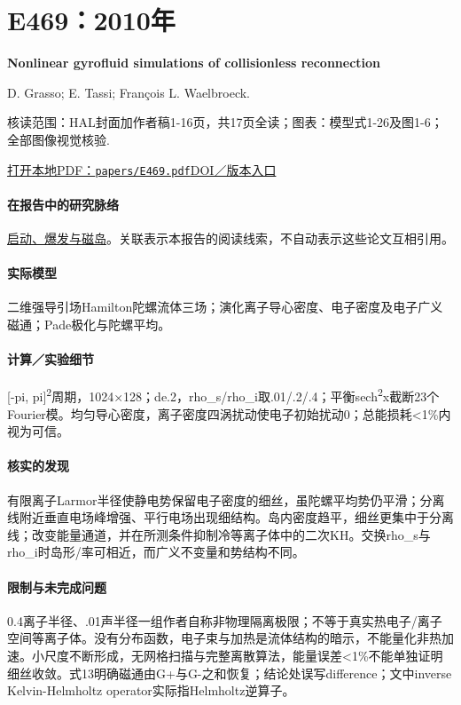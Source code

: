 \documentclass[UTF8,a4paper,11pt,openany,fontset=fandol]{ctexbook}
\begin{document}
\section{E469：2010年}\label{paper:E469}

\textbf{Nonlinear gyrofluid simulations of collisionless reconnection}\citep{E469}\

D. Grasso;  E. Tassi;  François L. Waelbroeck.

\textsf{核读范围：}HAL封面加作者稿1-16页，共17页全读；\textsf{图表：}模型式1-26及图1-6；全部图像视觉核验.

\href{run:../papers/E469.pdf}{打开本地PDF：\texttt{papers/E469.pdf}}\quad\href{https://doi.org/10.1063/1.3475440}{DOI／版本入口}

\paragraph{在报告中的研究脉络}\hyperref[story:onset]{启动、爆发与磁岛}。关联表示本报告的阅读线索，不自动表示这些论文互相引用。

\paragraph{实际模型}二维强导引场Hamilton陀螺流体三场；演化离子导心密度、电子密度及电子广义磁通；Pade极化与陀螺平均。

\paragraph{计算／实验细节}[-pi, pi]\textsuperscript{2}周期，1024×128；de.2，rho\_s/rho\_i取.01/.2/.4；平衡sech\textsuperscript{2}x截断23个Fourier模。均匀导心密度，离子密度四涡扰动使电子初始扰动0；总能损耗<1\%内视为可信。

\paragraph{核实的发现}有限离子Larmor半径使静电势保留电子密度的细丝，虽陀螺平均势仍平滑；分离线附近垂直电场峰增强、平行电场出现细结构。岛内密度趋平，细丝更集中于分离线；改变能量通道，并在所测条件抑制冷等离子体中的二次KH。交换rho\_s与rho\_i时岛形/率可相近，而广义不变量和势结构不同。

\paragraph{限制与未完成问题}0.4离子半径、.01声半径一组作者自称非物理隔离极限；不等于真实热电子/离子空间等离子体。没有分布函数，电子束与加热是流体结构的暗示，不能量化非热加速。小尺度不断形成，无网格扫描与完整离散算法，能量误差<1\%不能单独证明细丝收敛。式13明确磁通由G+与G-之和恢复；结论处误写difference；文中inverse Kelvin-Helmholtz operator实际指Helmholtz逆算子。
\end{document}
